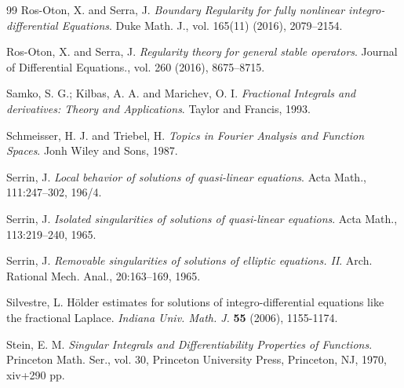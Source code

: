 \documentclass[10pt, leqno]{article}
\theoremstyle{definition}
\theoremstyle{remark}
\numberwithin{equation}{section}
\begin{document}
\begin{thebibliography}{99}
 Ros-Oton, X. and Serra, J.  \textit{Boundary Regularity for fully nonlinear integro-differential Equations}. Duke Math. J., vol. 165(11) (2016), 2079--2154.

 Ros-Oton, X. and Serra, J.  \textit{Regularity theory for general stable operators}. Journal of Differential Equations., vol. 260 (2016), 8675--8715.

 Samko, S. G.; Kilbas, A. A. and Marichev, O. I. \textit{Fractional Integrals and derivatives: Theory and Applications}. Taylor and Francis, 1993.

 Schmeisser, H. J. and Triebel, H. \textit{Topics in Fourier Analysis and Function Spaces}. Jonh Wiley and Sons, 1987.

 Serrin, J. \textit{Local behavior of solutions of quasi-linear equations}. Acta Math.,
 111:247--302, 196/4.

 Serrin, J. \textit{Isolated singularities of solutions of quasi-linear equations}. Acta Math., 113:219--240, 1965.

 Serrin, J. \textit{Removable singularities of solutions of elliptic equations. II}.
 Arch. Rational Mech. Anal., 20:163--169, 1965.

 Silvestre, L. H\"older estimates for solutions of integro-differential equations like the fractional Laplace. \textit{Indiana Univ. Math. J.} \textbf{55} (2006), 1155-1174.

 Stein, E. M. \textit{Singular Integrals and Differentiability Properties of Functions}. Princeton Math. Ser., vol. 30, Princeton
University Press, Princeton, NJ, 1970, xiv+290 pp.

\end{thebibliography}
\end{document}
